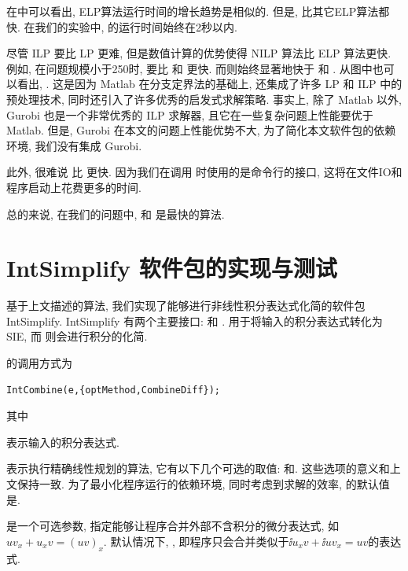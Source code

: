 在中可以看出, ELP算法运行时间的增长趋势是相似的. 但是, 比其它ELP算法都快. 在我们的实验中, 的运行时间始终在2秒以内. 

尽管 ILP 要比 LP 更难, 但是数值计算的优势使得 NILP 算法比 ELP 算法更快. 例如, 在问题规模小于250时,  要比  和 更快. 而则始终显著地快于 和 . 从图中也可以看出, . 这是因为 Matlab 在分支定界法\cite{wolsey1998integer}的基础上, 还集成了许多 LP 和 ILP 中的预处理技术\cite{preLP1995,preLP2003,preMILP1994,cut2008}, 同时还引入了许多优秀的启发式求解策略\cite{Heuristics2005,berthold2006primal}. 事实上, 除了 Matlab 以外, Gurobi 也是一个非常优秀的 ILP 求解器, 且它在一些复杂问题上性能要优于 Matlab. 但是, Gurobi 在本文的问题上性能优势不大, 为了简化本文软件包的依赖环境, 我们没有集成 Gurobi. 

此外, 很难说  比  更快. 因为我们在调用 时使用的是命令行的接口, 这将在文件IO和程序启动上花费更多的时间.

总的来说, 在我们的问题中,  和  是最快的算法. 

\section{IntSimplify 软件包的实现与测试}\label{Results-03}
基于上文描述的算法, 我们实现了能够进行非线性积分表达式化简的软件包 IntSimplify. IntSimplify 有两个主要接口:  和 .  用于将输入的积分表达式转化为SIE, 而 则会进行积分的化简.

的调用方式为
\begin{verbatim}
IntCombine(e,{optMethod,CombineDiff});
\end{verbatim}
其中 
\begin{compactitem}[\textbullet]
\item {}表示输入的积分表达式.
\item {}表示执行精确线性规划的算法, 它有以下几个可选的取值: 和. 这些选项的意义和上文保持一致. 为了最小化程序运行的依赖环境, 同时考虑到求解的效率, 的默认值是. 
\item {}是一个可选参数, 指定能够让程序合并外部不含积分的微分表达式, 如$uv_x+u_xv=(uv)_x$. 默认情况下, , 即程序只会合并类似于$\ii{u_xv}+\ii{uv_x}=uv$的表达式. 
\end{compactitem}

